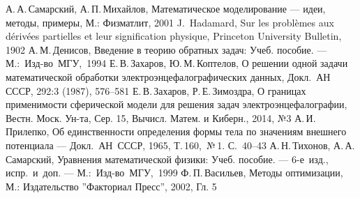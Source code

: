 \documentclass[oneside,final,12pt]{article}
\theoremstyle{definition}
\begin{document}
	
	
	
    \setcounter{page}{2}
	\tableofcontents
	\pagebreak
	
	
	
	
	
	
	
	
	
	
	
	
	
	\newpage
	\begin{thebibliography}{99}
        А.\,А.\,Самарский, А.\,П.\,Михайлов, Математическое моделирование --- идеи, методы, примеры, М.: Физматлит, 2001
        J.\, Hadamard, Sur les problèmes aux dérivées partielles et leur signification physique, Princeton University Bulletin, 1902
        А.\,М.\,Денисов, Введение в теорию обратных задач: Учеб. пособие. ---\\
        М.:~Изд-во~МГУ,~1994
        Е.\,В.\,Захаров, Ю.\,М.\,Коптелов, О решении одной задачи математической обработки электроэнцефалографических данных, Докл.~АН СССР, 292:3 (1987), 576–581
        Е.\,В.\,Захаров, Р.\,Е.\,Зимоздра, О границах применимости сферической модели для решения задач электроэнцефалографии, Вестн. Моск. Ун-та, Сер. 15, Вычисл. Матем. и Киберн., 2014, №3
        А.\,И.\,Прилепко, Об единственности определения формы тела по значениям внешнего потенциала --- Докл.~АН~СССР, 1965, Т.\,160,~№\,1. С.~40--43
		А.\,Н.\,Тихонов, А.\,А.\,Самарский, Уравнения математической физики: Учеб. пособие. --- 6-е~изд., испр.~и~доп. --- М.:~Изд-во~МГУ,~1999
        Ф.\,П.\,Васильев, Методы оптимизации, М.: Издательство ''Факториал Пресс'', 2002, Гл. 5
	\end{thebibliography}
\end{document}
